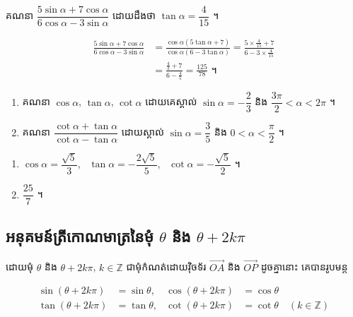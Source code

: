 \begin{example}[លំហាត់គំរូ ៦]
គណនា $\dfrac{5\sin\alpha + 7\cos\alpha}{6\cos\alpha - 3\sin\alpha}$ ដោយដឹងថា $\tan\alpha = \dfrac{4}{15}$ ។
\end{example}
\ans
\[
\begin{aligned}
\frac{5\sin\alpha + 7\cos\alpha}{6\cos\alpha - 3\sin\alpha} &= \frac{\cos\alpha(5\tan\alpha + 7)}{\cos\alpha(6 - 3\tan\alpha)} = \frac{5 \times \frac{4}{15} + 7}{6 - 3 \times \frac{4}{15}}\\
&= \frac{\frac{4}{3} + 7}{6 - \frac{4}{5}} = \frac{125}{78} \text{ ។}
\end{aligned}
\]

\begin{pro}
\begin{enumerate}[1]
  \item គណនា $\cos\alpha$, $\tan\alpha$, $\cot\alpha$ ដោយគេស្គាល់ $\sin\alpha = -\dfrac{2}{3}$ និង $\dfrac{3\pi}{2} < \alpha < 2\pi$ ។
  \item គណនា $\dfrac{\cot\alpha + \tan\alpha}{\cot\alpha - \tan\alpha}$ ដោយស្គាល់ $\sin\alpha = \dfrac{3}{5}$ និង $0 < \alpha < \dfrac{\pi}{2}$ ។
\end{enumerate}
\ans
\begin{enumerate}[1]
  \item $\cos\alpha = \dfrac{\sqrt{5}}{3}$, \ $\tan\alpha = -\dfrac{2\sqrt{5}}{5}$, \ $\cot\alpha = -\dfrac{\sqrt{5}}{2}$ ។
  \item $\dfrac{25}{7}$ ។
\end{enumerate}
\end{pro}

\subsection{អនុគមន៍ត្រីកោណមាត្រនៃមុំ \texorpdfstring{$\theta$}{θ} និង \texorpdfstring{$\theta + 2k\pi$}{θ + 2kπ}}

ដោយមុំ $\theta$ និង $\theta + 2k\pi$, $k \in \mathbb{Z}$ ជាមុំកំណត់ដោយវ៉ិចទ័រ $\overrightarrow{OA}$ និង $\overrightarrow{OP}$ ដូចគ្នានោះ គេបានរូបមន្ត
\begin{formulaBox}[រូបមន្ត]
\[
\begin{aligned}
\sin(\theta + 2k\pi) &= \sin\theta, & \cos(\theta + 2k\pi) &= \cos\theta\\
\tan(\theta + 2k\pi) &= \tan\theta, & \cot(\theta + 2k\pi) &= \cot\theta \quad (k \in \mathbb{Z})
\end{aligned}
\]
\end{formulaBox}

